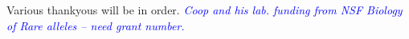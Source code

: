\documentclass{pnastwo}
\newcommand{\jri}[1]{\textcolor{blue}{\emph{#1}} }
\begin{document}
\begin{article}
\begin{acknowledgments}
Various thankyous will be in order. \jri{Coop and his lab. funding from NSF Biology of Rare alleles -- need grant number.}
\end{acknowledgments}












\end{article}
\end{document}
